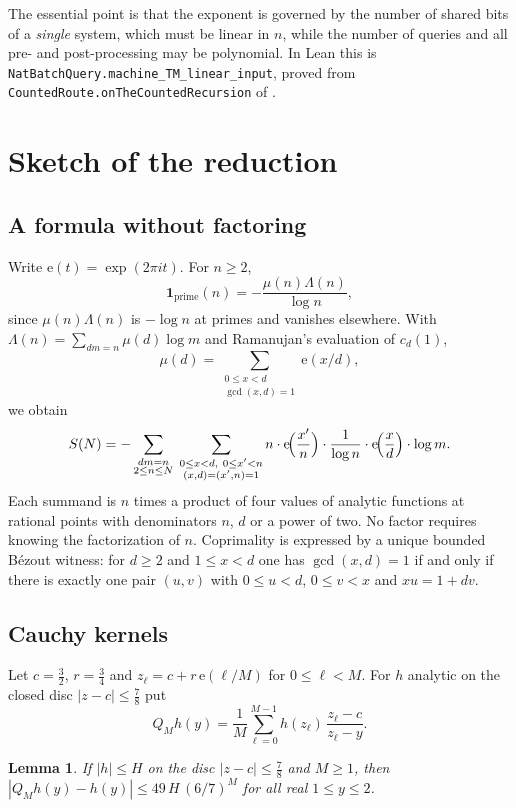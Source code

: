 \documentclass[11pt]{amsart}
\newtheorem{lemma}[theorem]{Lemma}
\theoremstyle{remark}
\newcommand{\e}{\mathrm{e}}
\newcommand{\lean}[1]{\texttt{#1}}
\begin{document}
The essential point is that the exponent is governed by the number of shared
bits of a \emph{single} system, which must be linear in $n$, while the number
of queries and all pre- and post-processing may be polynomial.
In Lean this is \lean{NatBatchQuery.machine\_TM\_linear\_input}, proved from
\lean{CountedRoute.onTheCountedRecursion} of \cite{A}.

\section{Sketch of the reduction}

\subsection{A formula without factoring}
Write $\e(t)=\exp(2\pi i t)$.  For $n\ge2$,
\[
  \mathbf 1_{\mathrm{prime}}(n)=-\frac{\mu(n)\Lambda(n)}{\log n},
\]
since $\mu(n)\Lambda(n)$ is $-\log n$ at primes and vanishes elsewhere.
With $\Lambda(n)=\sum_{dm=n}\mu(d)\log m$ and Ramanujan's evaluation
\cite{R} of $c_d(1)$,
\[
  \mu(d)=\sum_{\substack{0\le x<d\\ \gcd(x,d)=1}}\e(x/d),
\]
we obtain
\begin{equation}\label{eq:four}
  S(N)=-\sum_{\substack{dm=n\\ 2\le n\le N}}\;
  \sum_{\substack{0\le x<d,\ 0\le x'<n\\ (x,d)=(x',n)=1}}
  n\cdot\e\!\Bigl(\frac{x'}{n}\Bigr)\cdot\frac{1}{\log n}\cdot
  \e\!\Bigl(\frac{x}{d}\Bigr)\cdot\log m .
\end{equation}
Each summand is $n$ times a product of four values of analytic functions at
rational points with denominators $n$, $d$ or a power of two.  No factor
requires knowing the factorization of $n$.  Coprimality is expressed by a
unique bounded B\'ezout witness: for $d\ge2$ and $1\le x<d$ one has
$\gcd(x,d)=1$ if and only if there is exactly one pair $(u,v)$ with
$0\le u<d$, $0\le v<x$ and $xu=1+dv$.

\subsection{Cauchy kernels}
Let $c=\tfrac32$, $r=\tfrac34$ and $z_\ell=c+r\,\e(\ell/M)$ for
$0\le\ell<M$.  For $h$ analytic on the closed disc $|z-c|\le\tfrac78$ put
\[
  Q_Mh(y)=\frac1M\sum_{\ell=0}^{M-1}h(z_\ell)\,\frac{z_\ell-c}{z_\ell-y}.
\]

\begin{lemma}\label{lem:quad}
If $|h|\le H$ on the disc $|z-c|\le\tfrac78$ and $M\ge1$, then
$|Q_Mh(y)-h(y)|\le 49\,H\,(6/7)^M$ for all real $1\le y\le2$.
\end{lemma}
\end{document}
